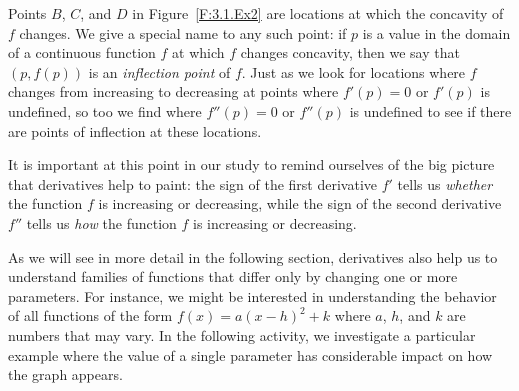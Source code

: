 \afterex

Points $B$, $C$, and $D$ in Figure~\ref{F:3.1.Ex2} are locations at which the concavity of $f$ changes.  We give a special name to any such point:  if $p$ is a value in the domain of a continuous function $f$ at which $f$ changes concavity, then we say that $(p,f(p))$ is an \emph{inflection point}  of $f$.  Just as we look for locations where $f$ changes from increasing to decreasing at points where $f'(p) = 0$ or $f'(p)$ is undefined, so too we find where $f''(p) = 0$ or $f''(p)$ is undefined to see if there are points of inflection at these locations.

It is important at this point in our study to remind ourselves of the big picture that derivatives help to paint:  the sign of the first derivative $f'$ tells us \emph{whether} the function $f$ is increasing or decreasing, while the sign of the second derivative $f''$ tells us \emph{how} the function $f$ is increasing or decreasing.



As we will see in more detail in the following section, derivatives also help us to understand families of functions that differ only by changing one or more parameters.  For instance, we might be interested in understanding the behavior of all functions of the form $f(x) = a(x-h)^2 + k$ where $a$, $h$, and $k$ are numbers that may vary.  In the following activity, we investigate a particular example where the value of a single parameter has considerable impact on how the graph appears.



\newpage

